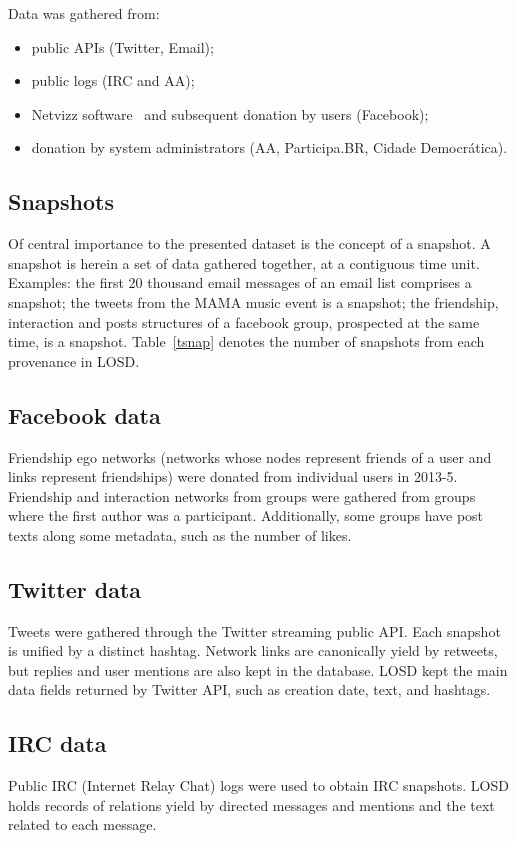 \documentclass[data,datadescriptor,submit,moreauthors,pdftex]{Definitions/mdpi}
\begin{document}
\noindent Data was gathered from:
\begin{itemize}
    \item public APIs (Twitter, Email);
    \item public logs (IRC and AA);
    \item Netvizz software~\cite{netvizz} and subsequent donation by users (Facebook);
    \item donation by system administrators (AA, Participa.BR, Cidade Democr\'atica).
\end{itemize}

\subsection{Snapshots}
Of central importance to the presented dataset is the concept of a snapshot.
A snapshot is herein a set of data gathered together, at a contiguous time
unit.
Examples: the first 20 thousand email messages of an email list
comprises a snapshot; the tweets from the MAMA music event is a
snapshot; the friendship, interaction and posts structures of a facebook
group, prospected at the same time, is a snapshot.
Table~\ref{tsnap} denotes the number of snapshots from each provenance in LOSD.



\subsection{Facebook data}
Friendship ego networks (networks whose nodes represent friends of a user and links represent friendships)
were donated from individual users in 2013-5.
Friendship and interaction networks from groups were gathered from
groups where the first author was a participant.
Additionally, some groups have post texts along some metadata, such as
the number of likes.

\subsection{Twitter data}
Tweets were gathered through the Twitter streaming public API.
Each snapshot is unified by a distinct hashtag.
Network links are canonically yield by retweets,
but replies and user mentions are also kept in the database.
LOSD kept the main data fields returned by Twitter API,
such as creation date, text, and hashtags.

\subsection{IRC data}
Public IRC (Internet Relay Chat) logs were used to obtain IRC snapshots.
LOSD holds records of relations yield by directed messages and
mentions and the text related to each message.
\end{document}
